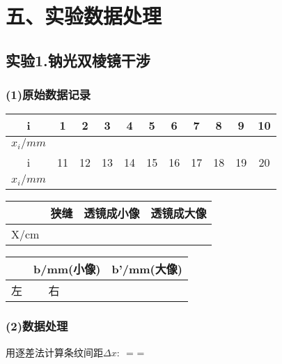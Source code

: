 \section*{五、实验数据处理}
\subsection*{实验1.钠光双棱镜干涉}
\subsubsection*{(1)原始数据记录}

\begin{center}
\begin{table}[htbp]
\begin{tabular}{|c|c|c|c|c|c|c|c|c|c|c|}
\hline
i & 1 & 2 & 3 & 4 & 5 & 6 & 7 & 8 & 9 & 10
\\
\hline
$x_i/mm$
{%
{%
&%
{%
{%
\\
\hline
i & 11 & 12 & 13 & 14 & 15 & 16 & 17 & 18 & 19 & 20
\\
\hline
$x_i/mm$
{%
{%
&%
{%
{%
\\
\hline
\end{tabular}
\end{table}
\begin{table}[htbp]
\begin{tabular}{|c|c|c|c|}
\hline
   & 狭缝 & 透镜成小像 & 透镜成大像 \\
\hline
X/cm
{%
&%
{%
\\
\hline
\end{tabular}
\end{table}
\begin{table}[htbp]
\begin{tabular}{|c|c|c|c|c|}
\hline
 & \multicolumn{2}{|c|}{b/mm(小像) }& \multicolumn{2}{|c|}{b'/mm(大像)} \\
\hline
左 & %
\hline
右 & %
\hline
\end{tabular}
\end{table}
\end{center}

\subsubsection*{(2)数据处理}
用逐差法计算条纹间距${\Delta}x$:
$$ = \displaystyle{} = %

